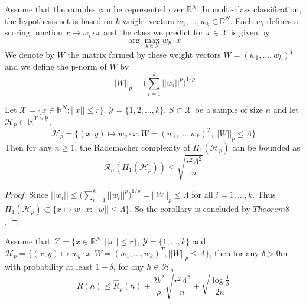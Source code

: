 Assume that the samples can be represented over $\mathbb{R}^N$. In multi-class classification, the hypothesis set is based on $k$ weight vectors $w_1,...,w_k \in \mathbb{R}^N$. Each $w_i$ defines a scoring function $x \mapsto w_i\cdot x$ and the class we predict for $x \in \mathcal{X}$ is given by
\begin{equation}
\arg\max_{y\in \mathcal{Y}} w_y \cdot x
\end{equation}
We denote by $W$ the matrix formed by these weight vectors $W = (w_1,...,w_k)^T$ and we define the p-norm of $W$ by 
\begin{equation}
||W||_p = \big(\sum_{i=1}^{k}||w_i||^p\big)^{1/p}
\end{equation}
\begin{corollary}
	Let $\mathcal{X} = \{x\in\mathbb{R}^N : ||x||\leq r \} $. $\mathcal{Y}=\{1,2,...,k \} $. $S \subset \mathcal{X}$ be a sample of size $n$ and let $\mathcal{H}_p \subset \mathbb{R}^{\mathcal{X}\times \mathcal{Y}}$,
	\begin{equation}
	\mathcal{H}_p = \{(x,y) \mapsto w_y \cdot x : W = (w_1,...,w_k)^T, ||W||_p\leq \Lambda \}
	\end{equation}
	Then for any $n \geq 1$, the Rademacher complexity of $\Pi_1(\mathcal{H}_p)$ can be bounded as
	\begin{equation}
	\mathcal{R}_n(\Pi_1(\mathcal{H}_p)) \leq \sqrt{\frac{r^2\Lambda^2}{n}}
	\end{equation}
\end{corollary}
\begin{proof}
	Since $||w_i|| \leq \big(\sum_{i=1}^{k}||w_i||^p\big)^{1/p} = ||W||_p\leq \Lambda$ for all $i=1,...,k$. Thus $\Pi_1(\mathcal{H}_p) \subset \{x \mapsto w \cdot x : ||w||\leq \Lambda \}$. So the corollary is concluded by $Theorem8$.
\end{proof}

\begin{corollary}
	Assume that $\mathcal{X} = \{ x\in \mathbb{R}^N : ||x|| \leq r \}$, $\mathcal{Y}=\{1,...,k\}$ and $\mathcal{H}_p = \{(x,y) \mapsto w_y \cdot x : W = (w_1,...,w_k)^T, ||W||_p\leq \Lambda \}$, then for any $\delta >0$m with probability at least $1-\delta$, for any $h \in \mathcal{H}_p$
	\begin{equation}
	R(h) \leq \hat{R}_{\rho}(h) + \frac{2k^2}{\rho}\sqrt{\frac{r^2\Lambda^2}{n}} + \sqrt{\frac{\log\frac{1}{\delta}}{2n}}
	\end{equation}
\end{corollary}

